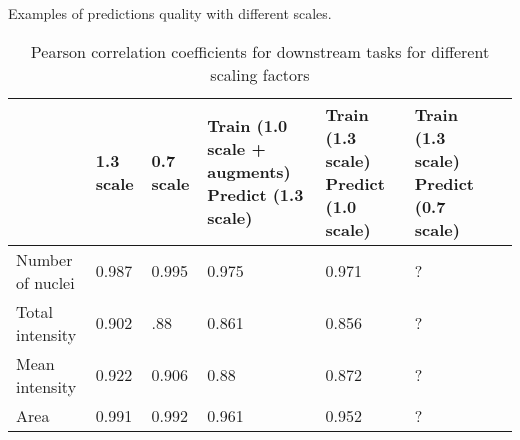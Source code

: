 Examples of predictions quality with different scales.

\begin{table}[H]
    \centering
    \caption{Pearson correlation coefficients for downstream tasks for different scaling factors} 
        \begin{adjustbox}{width=\textwidth}
            \begin{tabular}{|M{35mm}|M{35mm}|M{35mm}|M{35mm}|M{35mm}|M{35mm}|M{35mm}|}\hline
                &1.3 scale&0.7 scale&Train (1.0 scale + augments) \newline Predict (1.3 scale)&Train (1.3 scale) \newline Predict (1.0 scale)&Train (1.3 scale) \newline Predict (0.7 scale)
                \\\hline\hline
                Number of nuclei&0.987&0.995&0.975&0.971&?\\\hline
                Total intensity&0.902&.88&0.861&0.856&?\\\hline
                Mean intensity&0.922&0.906&0.88&0.872&?\\\hline
                Area&0.991&0.992&0.961&0.952&?\\\hline
            \end{tabular}
        \end{adjustbox}
\end{table}
